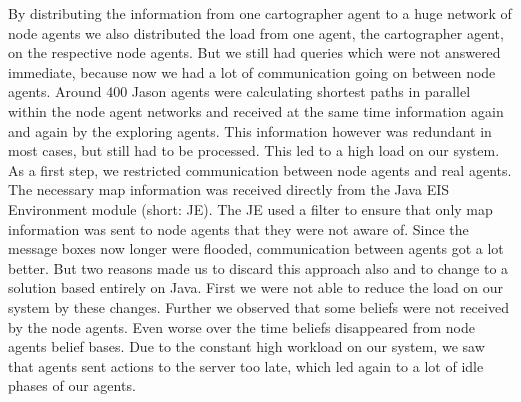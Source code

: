 By distributing the information from one cartographer agent to a huge network of node agents we also distributed the load from one agent, the cartographer agent, on the respective node agents. But we still had queries which were not answered immediate, because now we had a lot of communication going on between node agents. Around 400 Jason agents were calculating shortest paths in parallel within the node agent networks and received at the same time information again and again by the exploring agents. This information however was redundant in most cases, but still had to be processed. This led to a high load on our system. As a first step, we restricted communication between node agents and real agents. The necessary map information was received directly from the Java EIS Environment module (short: JE). The JE used a filter to ensure that only map information was sent to node agents that they were not aware of. Since the message boxes now longer were flooded, communication between agents got a lot better. But two reasons made us to discard this approach also and to change to a solution based entirely on Java. First we were not able to reduce the load on our system by these changes. Further we observed that some beliefs were not received by the node agents. Even worse over the time beliefs disappeared from node agents belief bases. Due to the constant high workload on our system, we saw that agents sent actions to the server too late, which led again to a lot of idle phases of our agents.

